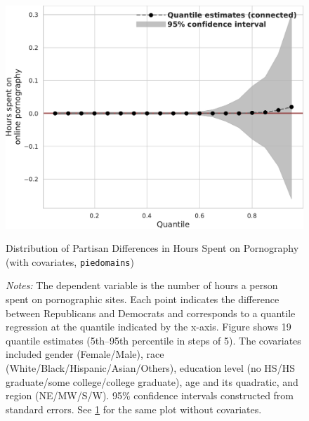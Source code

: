 \documentclass[12pt,twoside]{article}
\begin{document}
\begin{figure}[ht]
	\centering
	\includegraphics[width=.6\linewidth]{figs/quantile_reg_covariates_duration_adult.pdf}
	\caption{Distribution of Partisan Differences in Hours Spent on Pornography (with covariates, \texttt{piedomains})}
	\caption*{\footnotesize \emph{Notes:} 
		The dependent variable is the number of hours a person spent on pornographic sites.
		Each point indicates the difference between Republicans and Democrats and corresponds to a quantile regression at the quantile indicated by the x-axis.
  Figure shows 19 quantile estimates (5th--95th percentile in steps of 5).
		The covariates included gender (Female/Male), race (White/Black/Hispanic/Asian/Others), education level (no HS/HS graduate/some college/college graduate), age and its quadratic, and region (NE/MW/S/W).
		95\% confidence intervals constructed from standard errors.
		See \cref{fig:piedomains_quantile_regression_duration_covariates} for the same plot without covariates.
	}
	\label{fig:piedomains_quantile_regression_duration_covariates}
\end{figure}



\FloatBarrier
\clearpage
\end{document}
